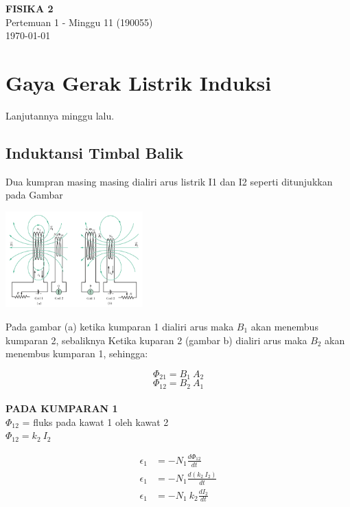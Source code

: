 \documentclass[twocolumn, 11pt]{article}%
\begin{document}
\begin{strip}
  \vspace*{\dimexpr-\stripsep}
  \begin{center}
      \Large\textbf{FISIKA 2}\\
      \large{Pertemuan 1 - Minggu 11 (190055)}\\
      \large{\today}
   \end{center}
\end{strip}

\section{Gaya Gerak Listrik Induksi}
Lanjutannya minggu lalu.

\subsection{Induktansi Timbal Balik}%
Dua kumpran masing masing dialiri arus listrik I1  dan I2 seperti ditunjukkan pada Gambar
\begin{center}
    \includegraphics[width=200px]{1.png}
\end{center}

Pada gambar (a) ketika kumparan 1 dialiri arus maka $B_1$ akan menembus
kumparan 2, sebaliknya Ketika kuparan 2 (gambar b) dialiri arus maka
$B_2$ akan menembus kumparan 1, sehingga:

\[\Phi_{21} =B_1\ A_2\]
\[\Phi_{12} =B_2\ A_1\]\\

\textbf{PADA KUMPARAN 1}\\
$\Phi_{12}$ = fluks pada kawat 1 oleh kawat 2\\
$\Phi_{12} = k_2\ I_2$

\begin{align*}
    \epsilon_1 &=-N_1 \frac{d\Phi_{12}}{dt}\\
    \epsilon_1 &=-N_1 \frac{d(k_2\ I_2)}{dt}\\
    \epsilon_1 &=-N_1\ k_2 \frac{dI_2}{dt}\\
\end{align*}
\end{document}
